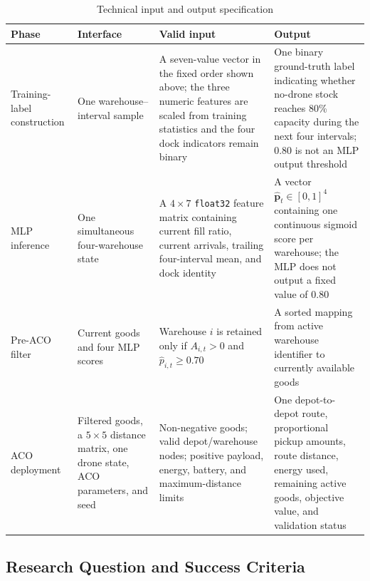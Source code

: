 \documentclass[10pt]{article}
\begin{document}
\begin{table}[H]
\centering
\caption{Technical input and output specification}
\label{tab:io}
\small
\begin{tabularx}{\textwidth}{p{}p{}YY}
\toprule
Phase & Interface & Valid input & Output \\
\midrule
Training-label construction & One warehouse--interval sample & A seven-value vector in the fixed order shown above; the three numeric features are scaled from training statistics and the four dock indicators remain binary & One binary ground-truth label indicating whether no-drone stock reaches 80\% capacity during the next four intervals; 0.80 is not an MLP output threshold \\
MLP inference & One simultaneous four-warehouse state & A $4\times7$ \texttt{float32} feature matrix containing current fill ratio, current arrivals, trailing four-interval mean, and dock identity & A vector $\hat{\mathbf p}_t\in[0,1]^4$ containing one continuous sigmoid score per warehouse; the MLP does not output a fixed value of 0.80 \\
Pre-ACO filter & Current goods and four MLP scores & Warehouse $i$ is retained only if $A_{i,t}>0$ and $\hat p_{i,t}\geq0.70$ & A sorted mapping from active warehouse identifier to currently available goods \\
ACO deployment & Filtered goods, a $5\times5$ distance matrix, one drone state, ACO parameters, and seed & Non-negative goods; valid depot/warehouse nodes; positive payload, energy, battery, and maximum-distance limits & One depot-to-depot route, proportional pickup amounts, route distance, energy used, remaining active goods, objective value, and validation status \\
\bottomrule
\end{tabularx}
\end{table}

\subsection{Research Question and Success Criteria}
\end{document}
